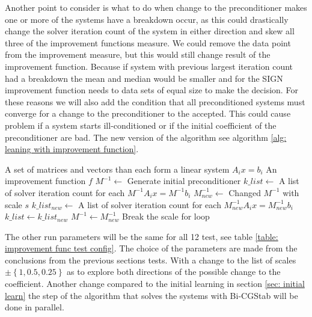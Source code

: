 Another point to consider is what to do when change to the preconditioner makes one or more of the systems have a breakdown occur, as this could drastically change the solver iteration count of the system in either direction and skew all three of the improvement functions measure. We could remove the data point from the improvement measure, but this would still change result of the improvement function. Because if system with previous largest iteration count had a breakdown the mean and median would be smaller and for the SIGN improvement function needs to data sets of equal size to make the decision. For these reasons we will also add the condition that all preconditioned systems must converge for a change to the preconditioner to the accepted. This could cause problem if a system starts ill-conditioned or if the initial coefficient of the preconditioner are bad. The new version of the algorithm see algorithm \ref{alg: leaning with improvement function}.


\begin{algorithm}
    \caption{Preconditioner learning algorithm with improvement functions.}\label{alg: leaning with improvement function}
    \begin{algorithmic}
        \Require A set of matrices and vectors than each form a linear system \(A_ix=b_i\)
        \Require An improvement function \(f\)
        \State \(M^{-1} \gets \) Generate initial preconditioner
        \State \(k\_list \gets\) A list of solver iteration count for each \(M^{-1}A_ix=M^{-1}b_i\)
                \State \(M^{-1}_{new} \gets \) Changed \(M^{-1}\) with scale \(s\)
                \State \(k\_list_{new} \gets\) A list of solver iteration count for each \(M^{-1}_{new}A_ix=M^{-1}_{new}b_i\)
                    \State \(k\_list \gets k\_list_{new}\)
                    \State \(M^{-1} \gets M^{-1}_{new}\)
                    \State Break the scale for loop
                \EndIf
            \EndLoop
        \EndLoop
    \end{algorithmic}
\end{algorithm}


The other run parameters will be the same for all 12 test,  see table \ref{table: improvement func test config}. The choice of the parameters are made from the conclusions from the previous sections tests. With a change to the list of scales \(\pm \left\lbrace 1,0.5,0.25\right\rbrace\) as to explore both directions of the possible change to the coefficient. Another change compared to the initial learning in section \ref{sec: initial learn} the step of the algorithm that solves the systems with Bi-CGStab will be done in parallel.

